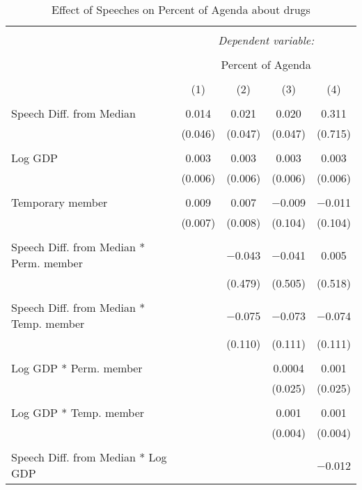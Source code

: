 
\begin{table}[!htbp] \centering 
  \caption{Effect of Speeches on Percent of Agenda about drugs} 
  \label{} 
\begin{tabular}{@{\extracolsep{5pt}}lcccc} 
\\[-1.8ex]\hline 
\hline \\[-1.8ex] 
 & \multicolumn{4}{c}{\textit{Dependent variable:}} \\ 
\cline{2-5} 
\\[-1.8ex] & \multicolumn{4}{c}{Percent of Agenda} \\ 
\\[-1.8ex] & (1) & (2) & (3) & (4)\\ 
\hline \\[-1.8ex] 
 Speech Diff. from Median & 0.014 & 0.021 & 0.020 & 0.311 \\ 
  & (0.046) & (0.047) & (0.047) & (0.715) \\ 
  & & & & \\ 
 Log GDP & 0.003 & 0.003 & 0.003 & 0.003 \\ 
  & (0.006) & (0.006) & (0.006) & (0.006) \\ 
  & & & & \\ 
 Temporary member & 0.009 & 0.007 & $-$0.009 & $-$0.011 \\ 
  & (0.007) & (0.008) & (0.104) & (0.104) \\ 
  & & & & \\ 
 Speech Diff. from Median * Perm. member &  & $-$0.043 & $-$0.041 & 0.005 \\ 
  &  & (0.479) & (0.505) & (0.518) \\ 
  & & & & \\ 
 Speech Diff. from Median * Temp. member &  & $-$0.075 & $-$0.073 & $-$0.074 \\ 
  &  & (0.110) & (0.111) & (0.111) \\ 
  & & & & \\ 
 Log GDP * Perm. member &  &  & 0.0004 & 0.001 \\ 
  &  &  & (0.025) & (0.025) \\ 
  & & & & \\ 
 Log GDP * Temp. member &  &  & 0.001 & 0.001 \\ 
  &  &  & (0.004) & (0.004) \\ 
  & & & & \\ 
 Speech Diff. from Median * Log GDP &  &  &  & $-$0.012 \\ 

\end{tabular}
\end{table}
